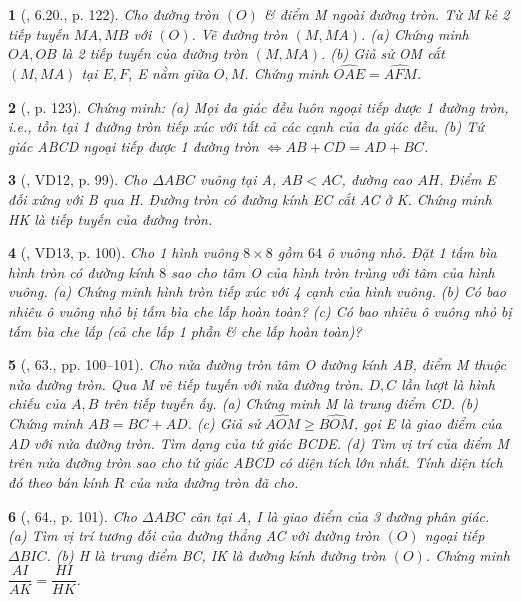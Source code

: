 \documentclass{article}
\newtheorem{baitoan}{}
\begin{document}
\begin{baitoan}[\cite{Binh_boi_duong_Toan_9_tap_1}, 6.20., p. 122]
	Cho đường tròn $(O)$ \& điểm M ngoài đường tròn. Từ M kẻ 2 tiếp tuyến $MA,MB$ với $(O)$. Vẽ đường tròn $(M,MA)$. (a) Chứng minh $OA,OB$ là 2 tiếp tuyến của đường tròn $(M,MA)$. (b) Giả sử OM cắt $(M,MA)$ tại $E,F$, E nằm giữa $O,M$. Chứng minh $\widehat{OAE} = \widehat{AFM}$.
\end{baitoan}

\begin{baitoan}[\cite{Binh_boi_duong_Toan_9_tap_1}, p. 123]
	Chứng minh: (a) Mọi đa giác đều luôn ngoại tiếp được 1 đường tròn, i.e., tồn tại 1 đường tròn tiếp xúc với tất cả các cạnh của đa giác đều. (b) Tứ giác ABCD ngoại tiếp được 1 đường tròn $\Leftrightarrow AB + CD = AD + BC$.
\end{baitoan}

\begin{baitoan}[\cite{Binh_Toan_9_tap_1}, VD12, p. 99]
	Cho $\Delta ABC$ vuông tại A, $AB < AC$, đường cao $AH$. Điểm E đối xứng với B qua H. Đường tròn có đường kính EC cắt AC ở K. Chứng minh HK là tiếp tuyến của đường tròn.
\end{baitoan}

\begin{baitoan}[\cite{Binh_Toan_9_tap_1}, VD13, p. 100]
	Cho 1 hình vuông $8\times8$ gồm $64$ ô vuông nhỏ. Đặt 1 tấm bìa hình tròn có đường kính $8$ sao cho tâm O của hình tròn trùng với tâm của hình vuông. (a) Chứng minh hình tròn tiếp xúc với 4 cạnh của hình vuông. (b) Có bao nhiêu ô vuông nhỏ bị tấm bìa che lấp hoàn toàn? (c) Có bao nhiêu ô vuông nhỏ bị tấm bìa che lấp (cả che lấp 1 phần \& che lấp hoàn toàn)?
\end{baitoan}

\begin{baitoan}[\cite{Binh_Toan_9_tap_1}, 63., pp. 100--101]
	Cho nửa đường tròn tâm O đường kính AB, điểm M thuộc nửa đường tròn. Qua M vẽ tiếp tuyến với nửa đường tròn. $D,C$ lần lượt là hình chiếu của $A,B$ trên tiếp tuyến ấy. (a) Chứng minh M là trung điểm CD. (b) Chứng minh $AB = BC + AD$. (c) Giả sử $ \widehat{AOM}\ge\widehat{BOM}$, gọi E là giao điểm của AD với nửa đường tròn. Tìm dạng của tứ giác BCDE. (d) Tìm vị trí của điểm M trên nửa đường tròn sao cho tứ giác ABCD có diện tích lớn nhất. Tính diện tích đó theo bán kính $R$ của nửa đường tròn đã cho.
\end{baitoan}

\begin{baitoan}[\cite{Binh_Toan_9_tap_1}, 64., p. 101]
	Cho $\Delta ABC$ cân tại A, I là giao điểm của 3 đường phân giác. (a) Tìm vị trí tương đối của đường thẳng AC với đường tròn $(O)$ ngoại tiếp $\Delta BIC$. (b) H là trung điểm BC, IK là đường kính đường tròn $(O)$. Chứng minh $\dfrac{AI}{AK} = \dfrac{HI}{HK}$.
\end{baitoan}
\end{document}

